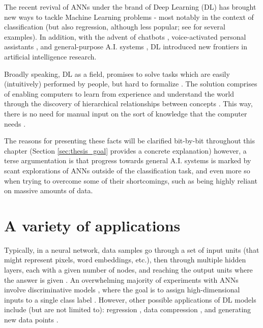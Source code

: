 \documentclass[a4paper]{book}
\begin{document}
The recent revival of ANNs under the brand of Deep Learning (DL) has brought new ways to tackle Machine Learning problems - most notably in the context of classification (but also regression, although less popular; see \cite{lecun_deep_2015} for several examples). In addition, with the advent of chatbots \parencite{dale_return_2016}, voice-activated personal assistants \parencite{xiong_microsoft_2018}, and general-purpose A.I. systems \parencite{vinyals_starcraft_2017}, DL introduced new frontiers in artificial intelligence research.

Broadly speaking, DL as a field, promises to solve tasks which are easily (intuitively) performed by people, but hard to formalize \parencite[e.g., recognizing faces or spoken word;][]{goodfellow_deep_2016}. The solution comprises of enabling computers to learn from experience and understand the world through the discovery of hierarchical relationships between concepts \parencite{lecun_deep_2015}. This way, there is no need for manual input on the sort of knowledge that the computer needs \parencite{goodfellow_deep_2016}.

The reasons for presenting these facts will be clarified bit-by-bit throughout this chapter (Section \ref{sec:thesis_goal} provides a concrete explanation) however, a terse argumentation is that progress towards general A.I. systems is marked by scant explorations of ANNs outside of the classification task, and even more so when trying to overcome some of their shortcomings, such as being highly reliant on massive amounts of data.

\section{A variety of applications}\label{sec:no_disc}

Typically, in a neural network, data samples go through a set of input units (that might represent pixels, word embeddings, etc.), then through multiple hidden layers, each with a given number of nodes, and reaching the output units where the answer is given \parencite{marcus_deep_2018}. An overwhelming majority of experiments with ANNs involve discriminative models \parencite{goodfellow_generative_2014}, where the goal is to assign high-dimensional inputs to a single class label \parencite[such as an animal or piece of furniture;][]{zhang_character-level_2015, krizhevsky_imagenet_2012}. However, other possible applications of DL models include (but are not limited to): regression \parencite{qiu_ensemble_2014}, data compression \parencite{cheng_deep_2018}, and generating new data points \parencite{graves_generating_2013}.
\end{document}
